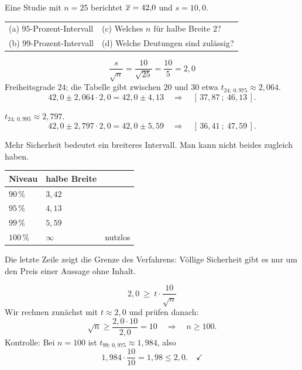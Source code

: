 \begin{aufgabe}
Eine Studie mit $n=25$ berichtet $\overline{x} = 42{,}0$ und $s = 10{,}0$.
\begin{center}
{\small
\renewcommand{\arraystretch}{1.35}
\begin{tabular}{@{}P{4.2cm}P{4.2cm}@{}}
\toprule
(a) $95$-Prozent-Intervall & (c) Welches $n$ für halbe Breite $2$?\\
(b) $99$-Prozent-Intervall & (d) Welche Deutungen sind zulässig?\\
\bottomrule
\end{tabular}}
\end{center}

\loesung
{}
\[ \frac{s}{\sqrt n} = \frac{10}{\sqrt{25}} = \frac{10}{5} = 2{,}0 \]
Freiheitsgrade $24$; die Tabelle gibt zwischen $20$ und $30$ etwa $t_{24;\,0{,}975} \approx 2{,}064$.
\[ 42{,}0 \pm 2{,}064 \cdot 2{,}0 = 42{,}0 \pm 4{,}13 \quad\Longrightarrow\quad [\,37{,}87\ ;\ 46{,}13\,] . \]

$t_{24;\,0{,}995} \approx 2{,}797$.
\[ 42{,}0 \pm 2{,}797 \cdot 2{,}0 = 42{,}0 \pm 5{,}59 \quad\Longrightarrow\quad [\,36{,}41\ ;\ 47{,}59\,] . \]

Mehr Sicherheit bedeutet ein breiteres Intervall. Man kann nicht beides zugleich haben.
\begin{center}
\renewcommand{\arraystretch}{1.42}
\begin{tabular}{@{}P{2.2cm}P{2.2cm}P{2.6cm}@{}}
\toprule
\textbf{Niveau} & \textbf{halbe Breite} & \\
\midrule
$90\,\%$ & $3{,}42$ & \\
$95\,\%$ & $4{,}13$ & \\
$99\,\%$ & $5{,}59$ & \\
$100\,\%$ & $\infty$ & \textcolor{akzent}{nutzlos}\\
\bottomrule
\end{tabular}
\end{center}
Die letzte Zeile zeigt die Grenze des Verfahrens: Völlige Sicherheit gibt es nur um den Preis einer Aussage ohne Inhalt.

\[ 2{,}0 \ \ge\ t \cdot \frac{10}{\sqrt n} \]
Wir rechnen zunächst mit $t \approx 2{,}0$ und prüfen danach:
\[ \sqrt n \ge \frac{2{,}0 \cdot 10}{2{,}0} = 10 \quad\Longrightarrow\quad n \ge 100 . \]
Kontrolle: Bei $n = 100$ ist $t_{99;\,0{,}975} \approx 1{,}984$, also
\[ 1{,}984 \cdot \frac{10}{10} = 1{,}98 \le 2{,}0 . \quad \checkmark \]


\end{aufgabe}
